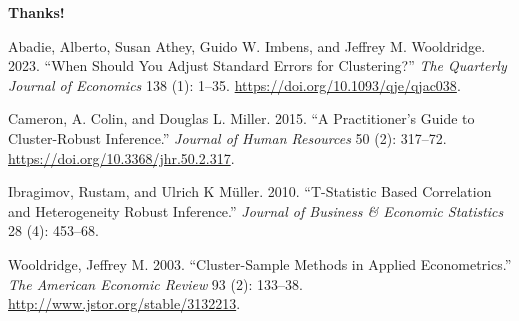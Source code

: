 \documentclass[
  ignorenonframetext,
]{beamer}
\newlength{\cslhangindent}
\newenvironment{CSLReferences}[2] %
 {\begin{list}{}{%
  \setlength{\itemindent}{0pt}
  \setlength{\leftmargin}{0pt}
  \setlength{\parsep}{0pt}
  \ifodd #1
   \setlength{\leftmargin}{\cslhangindent}
   \setlength{\itemindent}{-1\cslhangindent}
  \fi
  \setlength{\itemsep}{#2\baselineskip}}}
 {\end{list}}
\begin{document}
\begin{frame}[plain]{}
\label{section}
\centering
\vspace*{\fill}

\Huge \textbf{Thanks!} \vspace*{\fill}
\end{frame}

\begin{frame}
\label{refs}
\begin{CSLReferences}{1}{0}
Abadie, Alberto, Susan Athey, Guido W. Imbens, and Jeffrey M.
Wooldridge. 2023. {``When Should You Adjust Standard Errors for
Clustering?''} \emph{The Quarterly Journal of Economics} 138 (1): 1--35.
\url{https://doi.org/10.1093/qje/qjac038}.

Cameron, A. Colin, and Douglas L. Miller. 2015. {``A Practitioner's
Guide to Cluster-Robust Inference.''} \emph{Journal of Human Resources}
50 (2): 317--72. \url{https://doi.org/10.3368/jhr.50.2.317}.

Ibragimov, Rustam, and Ulrich K Müller. 2010. {``T-Statistic Based
Correlation and Heterogeneity Robust Inference.''} \emph{Journal of
Business \& Economic Statistics} 28 (4): 453--68.

Wooldridge, Jeffrey M. 2003. {``Cluster-Sample Methods in Applied
Econometrics.''} \emph{The American Economic Review} 93 (2): 133--38.
\url{http://www.jstor.org/stable/3132213}.

\end{CSLReferences}
\end{frame}
\end{document}
